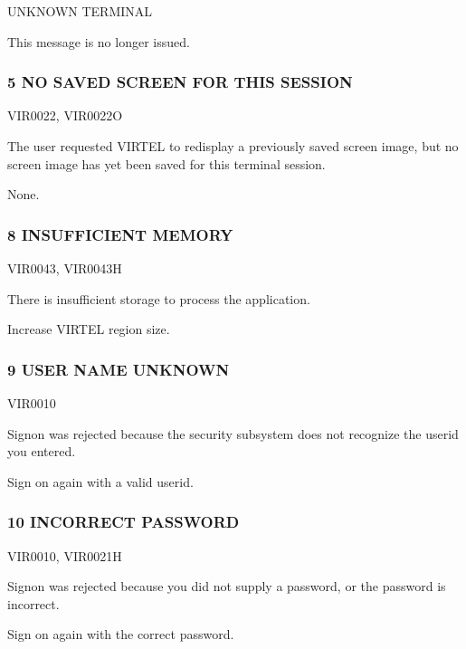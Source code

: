 \documentclass[letterpaper,10pt,english]{sphinxmanual}
\begin{document}
 UNKNOWN TERMINAL

\sphinxAtStartPar
This message is no longer issued.


\subsubsection{5 NO SAVED SCREEN FOR THIS SESSION}
\label{\detokenize{messages:no-saved-screen-for-this-session}}\begin{description}
\sphinxAtStartPar
VIR0022, VIR0022O

\sphinxAtStartPar
The user requested VIRTEL to redisplay a previously saved screen image, but no screen image has yet been saved for this terminal session.

\sphinxAtStartPar
None.

\end{description}


\subsubsection{8 INSUFFICIENT MEMORY}
\label{\detokenize{messages:insufficient-memory}}\begin{description}
\sphinxAtStartPar
VIR0043, VIR0043H

\sphinxAtStartPar
There is insufficient storage to process the application.

\sphinxAtStartPar
Increase VIRTEL region size.

\end{description}


\subsubsection{9 USER NAME UNKNOWN}
\label{\detokenize{messages:user-name-unknown}}\begin{description}
\sphinxAtStartPar
VIR0010

\sphinxAtStartPar
Signon was rejected because the security subsystem does not recognize the userid you entered.

\sphinxAtStartPar
Sign on again with a valid userid.

\end{description}


\subsubsection{10 INCORRECT PASSWORD}
\label{\detokenize{messages:incorrect-password}}\begin{description}
\sphinxAtStartPar
VIR0010, VIR0021H

\sphinxAtStartPar
Signon was rejected because you did not supply a password, or the password is incorrect.

\sphinxAtStartPar
Sign on again with the correct password.

\end{description}
\end{document}
